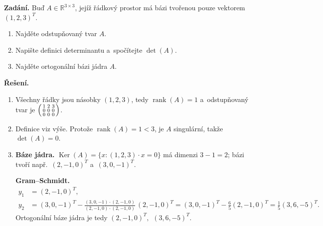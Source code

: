 \documentclass[11pt,a4paper]{article}
\newcommand{\rank}{\operatorname{rank}}
\newcommand{\Ker}{\operatorname{Ker}}
\begin{document}
\begin{priklad} \par
\textbf{Zadání.}
Buď $A\in\mathbb{R}^{3\times3}$, jejíž řádkový prostor má bázi tvořenou pouze vektorem $(1,2,3)^T$.
\begin{enumerate}[label=(\arabic*)]
  \item Najděte odstupňovaný tvar $A$.
  \item Napište definici determinantu a~spočítejte $\det(A)$.
  \item Najděte ortogonální bázi jádra $A$.
\end{enumerate}

\textbf{Řešení.}
\begin{enumerate}[label=(\arabic*)]
  \item Všechny řádky jsou násobky $(1,2,3)$, tedy $\rank(A)=1$ a~odstupňovaný tvar je $\begin{psmallmatrix}1&2&3\\0&0&0\\0&0&0\end{psmallmatrix}$.
  \item Definice viz výše. Protože $\rank(A)=1<3$, je $A$ singulární, takže $\det(A)=0$.
  \item \textbf{Báze jádra.} $\Ker(A)=\{x:(1,2,3)\cdot x=0\}$ má dimenzi $3-1=2$; bázi tvoří např.\ $(2,-1,0)^T$ a~$(3,0,-1)^T$.\par
    \textbf{Gram--Schmidt.}
    \[
    \begin{aligned}
      y_1&=(2,-1,0)^T,\\
      y_2&=(3,0,-1)^T-\frac{(3,0,-1)\cdot(2,-1,0)}{(2,-1,0)\cdot(2,-1,0)}\,(2,-1,0)^T=(3,0,-1)^T-\tfrac65(2,-1,0)^T=\tfrac15(3,6,-5)^T.
    \end{aligned}
    \]
    Ortogonální báze jádra je tedy $\boxed{(2,-1,0)^T,\ \ (3,6,-5)^T}$.
\end{enumerate}
\end{priklad}
\end{document}
